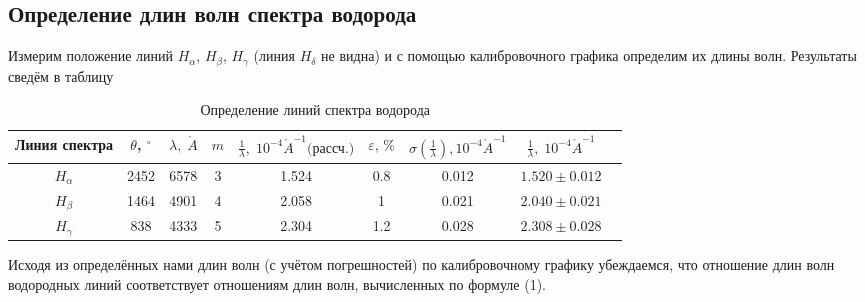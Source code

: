 \documentclass[a4paper,12pt]{article}
\begin{document}
\subsection*{Определение длин волн спектра водорода}
Измерим положение линий $H_\alpha$, $H_\beta$, $H_\gamma$ (линия $H_\delta$ не видна)
и с помощью калибровочного графика определим их длины волн. Результаты сведём
в таблицу 
 
\begin{table}[h!]
    \begin{center}
        \begin{tabular}{|c|c|c|c|c|c|c|c|c|}
            \hline 
            Линия спектра & $ \theta $, $ ^\circ $ & $ \lambda, \;\mathring{A} $ & $ m $  & $ \frac{1}{\lambda}, \;  10^{-4} \mathring{A}^{-1}\text{(рассч.)} $  & $\varepsilon,\,\%$ & $ \sigma(\frac{1}{\lambda}), 10^{-4} \mathring{A}^{-1} $ & $ \frac{1}{\lambda}, \;  10^{-4} \mathring{A}^{-1} $\\ 
            \hline 
        $ H_\alpha $ & 2452 & 6578 & 3  & 1.524 & 0.8 & 0.012 & $1.520\pm0.012$\\
        $ H_\beta $  & 1464 & 4901 & 4  & 2.058 & 1 & 0.021 & $2.040\pm0.021$\\
        $ H_\gamma $ & 838 & 4333 & 5  & 2.304 & 1.2 & 0.028 & $2.308\pm0.028$\\
            \hline 
        \end{tabular} 
    \end{center}
    \caption{Определение линий спектра водорода}
    \label{table_mn}
\end{table}

Исходя из определённых нами длин волн (с учётом погрешностей) по калибровочному графику убеждаемся,
что отношение длин волн водородных линий соответствует отношениям длин волн, вычисленных по формуле (1).
\end{document}
